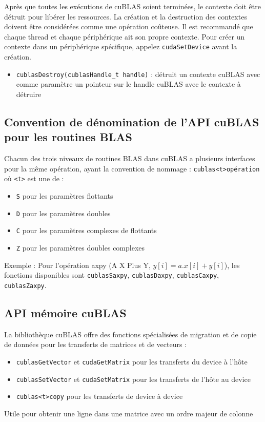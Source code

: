 \documentclass[11pt]{paper}
\begin{document}
Après que toutes les exécutions de cuBLAS soient terminées, le contexte doit être détruit pour libérer les ressources. La création et la destruction des contextes doivent être considérées comme une opération coûteuse. Il est recommandé que chaque thread et chaque périphérique ait son propre contexte.
Pour créer un contexte dans un périphérique spécifique, appelez {\tt cudaSetDevice} avant la création.
\begin{itemize}
	\item {\tt cublasDestroy(cublasHandle\_t handle)} : détruit un contexte cuBLAS avec comme paramètre un pointeur sur le handle cuBLAS avec le contexte à détruire
\end{itemize}

  \subsection{Convention de dénomination de l'API cuBLAS pour les routines BLAS}

Chacun des trois niveaux de routines BLAS dans cuBLAS a plusieurs interfaces pour la même opération, ayant la convention de nommage :
{\tt cublas<t>opération} où {\tt <t>} est une de :
\begin{itemize}
	\item {\tt S} pour les paramètres flottants
	\item {\tt D} pour les paramètres doubles
	\item {\tt C} pour les paramètres complexes de flottants
	\item {\tt Z} pour les paramètres doubles complexes
\end{itemize}
Exemple : Pour l'opération axpy (A X Plus Y, $y[i] = a.x[i] + y[i]$), les fonctions disponibles sont {\tt cublasSaxpy}, {\tt cublasDaxpy}, {\tt cublasCaxpy}, {\tt cublasZaxpy}.

  \subsection{API mémoire cuBLAS}

La bibliothèque cuBLAS offre des fonctions spécialisées de migration et de copie de données pour les transferts de matrices et de vecteurs :
\begin{itemize}
	\item {\tt cublasGetVector} et {\tt cudaGetMatrix} pour les transferts du device à l'hôte
	\item {\tt cublasSetVector} et {\tt cudaSetMatrix} pour les transferts de l'hôte au device
	\item {\tt cublas<t>copy} pour les transferts de device à device
\end{itemize}
Utile pour obtenir une ligne dans une matrice avec un ordre majeur de colonne
\end{document}
